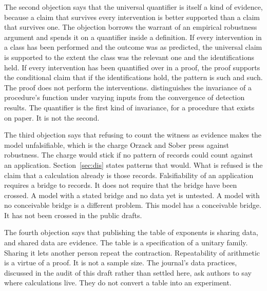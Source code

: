 \documentclass[11pt]{article}
\begin{document}
The second objection says that the universal quantifier is itself a kind of evidence, because a claim that survives every intervention is better supported than a claim that survives one. The objection borrows the warrant of an empirical robustness argument and spends it on a quantifier inside a definition. If every intervention in a class has been performed and the outcome was as predicted, the universal claim is supported to the extent the class was the relevant one and the identifications held. If every intervention has been quantified over in a proof, the proof supports the conditional claim that if the identifications hold, the pattern is such and such. The proof does not perform the interventions. \citet{karaca2022} distinguishes the invariance of a procedure's function under varying inputs from the convergence of detection results. The quantifier is the first kind of invariance, for a procedure that exists on paper. It is not the second.

The third objection says that refusing to count the witness as evidence makes the model unfalsifiable, which is the charge Orzack and Sober press against robustness. The charge would stick if no pattern of records could count against an application. Section~\ref{sec:dis} states patterns that would. What is refused is the claim that a calculation already is those records. Falsifiability of an application requires a bridge to records. It does not require that the bridge have been crossed. A model with a stated bridge and no data yet is untested. A model with no conceivable bridge is a different problem. This model has a conceivable bridge. It has not been crossed in the public drafts.

The fourth objection says that publishing the table of exponents is sharing data, and shared data are evidence. The table is a specification of a unitary family. Sharing it lets another person repeat the contraction. Repeatability of arithmetic is a virtue of a proof. It is not a sample size. The journal's data practices, discussed in the audit of this draft rather than settled here, ask authors to say where calculations live. They do not convert a table into an experiment.
\end{document}
